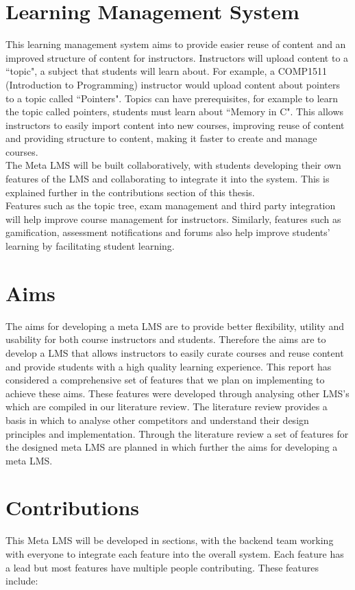 \section{Learning Management System}
This learning management system aims to provide easier reuse of content and an improved structure of content for instructors. Instructors will upload content to a ``topic", a subject that students will learn about. For example, a COMP1511 (Introduction to Programming) instructor would upload content about pointers to a topic called ``Pointers". Topics can have prerequisites, for example to learn the topic called pointers, students must learn about ``Memory in C". This allows instructors to easily import content into new courses, improving reuse of content and providing structure to content, making it faster to create and manage courses.\\
The Meta LMS will be built collaboratively, with students developing their own features of the LMS and collaborating to integrate it into the system. This is explained further in the contributions section of this thesis. \\
Features such as the topic tree, exam management and third party integration will help improve course management for instructors. Similarly, features such as gamification, assessment notifications and forums also help improve students' learning by facilitating student learning.\\

\section{Aims}
The aims for developing a meta LMS are to provide better flexibility, utility and usability for both course instructors and students. 
Therefore the aims are to develop a LMS that allows instructors to easily curate courses and reuse content and provide students with a high quality learning experience. 
This report has considered a comprehensive set of features that we plan on implementing to achieve these aims. 
These features were developed through analysing other LMS’s which are compiled in our literature review.
The literature review provides a basis in which to analyse other competitors and understand their design principles and implementation.
Through the literature review a set of features for the designed meta LMS are planned in which further the aims for developing a meta LMS.

\section{Contributions}
This Meta LMS will be developed in sections, with the backend team working with everyone to integrate each feature into the overall system. Each feature has a lead but most features have multiple people contributing. These features include:

